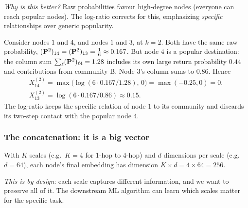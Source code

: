 \begin{notechapter}
\begin{intuition}
\emph{Why is this better?} Raw probabilities favour high-degree nodes (everyone can reach popular nodes). The log-ratio corrects for this, emphasizing \emph{specific} relationships over generic popularity.
\end{intuition}

\begin{example}
Consider nodes $1$ and $4$, and nodes $1$ and $3$, at $k = 2$. Both have the same raw probability, $(\mathbf{P}^2)_{14} = (\mathbf{P}^2)_{13} = \frac16 \approx 0.167$. But node $4$ is a popular destination: the column sum $\sum_\ell(\mathbf{P}^2)_{\ell4} = 1.28$ includes its own large return probability $0.44$ and contributions from community B. Node $3$'s column sums to $0.86$. Hence
\begin{gather*}
X^{(2)}_{14} = \max\bigl(\log(6\cdot0.167/1.28),\,0\bigr) = \max(-0.25, 0) = 0, \\
X^{(2)}_{13} = \log(6\cdot0.167/0.86) \approx 0.15 .
\end{gather*}
The log-ratio keeps the specific relation of node $1$ to its community and discards its two-step contact with the popular node $4$.
\end{example}

\subsubsection*{The concatenation: it is a big vector}

\begin{keyidea}
With $K$ scales (e.g.\ $K = 4$ for 1-hop to 4-hop) and $d$ dimensions per scale (e.g.\ $d = 64$), each node's final embedding has dimension $K \times d = 4 \times 64 = 256$.

\emph{This is by design}: each scale captures different information, and we want to preserve all of it. The downstream ML algorithm can learn which scales matter for the specific task.
\end{keyidea}

\begin{figure}[htbp]
\centering
{}
\end{figure}
\end{notechapter}
